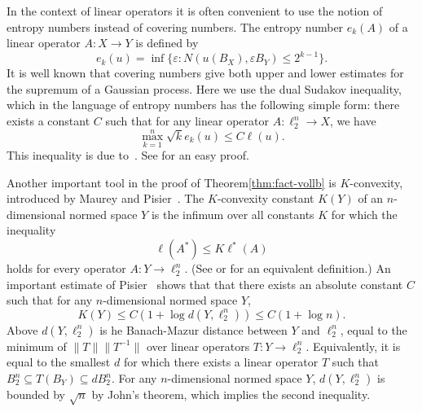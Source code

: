 In the context of linear operators it is often convenient to use the
notion of entropy numbers instead of covering numbers.  The entropy
number $e_k(A)$ of a linear operator $A:X \to Y$ is defined by
\[
e_k(u) = \inf\{\varepsilon: N(u(B_X), \varepsilon B_Y) \le 2^{k-1}\}. 
\]
It is well known that covering numbers give both upper and lower
estimates for the supremum of a Gaussian process. Here we use the dual
Sudakov inequality, which in the language of entropy numbers has the
following simple form: there exists a constant $C$ such that for any
linear operator $A:\ell_2^n \to X$, we have
\begin{equation}
  \label{eq:sudakov}
  \max_{k = 1}^n \sqrt{k}e_k(u) \le C\ell(u). 
\end{equation}
This inequality is due to~\cite{PTJ85}. See \cite[Section
3.3]{LT91-book} for an easy proof. 

Another important tool in the proof of Theorem\ref{thm:fact-vollb} is
$K$-convexity, introduced by Maurey and Pisier~\cite{MP76}. The
$K$-convexity constant $K(Y)$ of an $n$-dimensional normed space $Y$
is the infimum over all constants $K$ for which the inequality
\begin{equation}
  \label{eq:K-conv-def}
\ell(A^*) \le K\ell^*(A)
\end{equation}
holds for every operator $A:Y \to \ell_2^n$. (See
\cite{Pisier-book} or \cite{TJ-book} for an equivalent definition.)
An important estimate of Pisier~\cite{P80} shows that that there
exists an absolute constant $C$ such that for any $n$-dimensional
normed space $Y$, 
\begin{equation}
  \label{eq:K-conv-Pisier}
  K(Y) \le C(1+\log d(Y,\ell_2^n))\le C(1+\log n).
\end{equation}
Above $d(Y, \ell_2^n)$ is he Banach-Mazur distance between $Y$ and
$\ell_2^n$, equal to the minimum of $\|T\| \|T^{-1}\|$ over linear
operators $T:Y \to \ell_2^n$. Equivalently, it is equal to the
smallest $d$ for which there exists a linear operator $T$ such that
$B_2^n \subseteq T(B_Y) \subseteq d B_2^n$. For any $n$-dimensional
normed space $Y$, $d(Y,\ell_2^n)$ is bounded by $\sqrt{n}$ by John's
theorem, which implies the second inequality.

